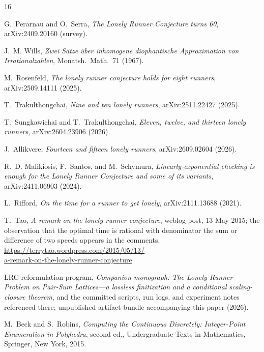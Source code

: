 
\begingroup\sloppy\raggedright
\begin{thebibliography}{16}

G.~Perarnau and O.~Serra,
\emph{The Lonely Runner Conjecture turns 60},
arXiv:2409.20160 (survey).

J.~M. Wills,
\emph{Zwei S\"atze \"uber inhomogene diophantische Approximation von
Irrationalzahlen},
Monatsh.\ Math.\ 71 (1967).

M.~Rosenfeld,
\emph{The lonely runner conjecture holds for eight runners},
arXiv:2509.14111 (2025).

T.~Trakulthongchai,
\emph{Nine and ten lonely runners},
arXiv:2511.22427 (2025).

T.~Sungkawichai and T.~Trakulthongchai,
\emph{Eleven, twelve, and thirteen lonely runners},
arXiv:2604.23906 (2026).

J.~Allikvere,
\emph{Fourteen and fifteen lonely runners},
arXiv:2609.02604 (2026).

R.~D. Malikiosis, F.~Santos, and M.~Schymura,
\emph{Linearly-exponential checking is enough for the Lonely Runner
Conjecture and some of its variants},
arXiv:2411.06903 (2024).

L.~Rifford,
\emph{On the time for a runner to get lonely},
arXiv:2111.13688 (2021).

T.~Tao,
\emph{A remark on the lonely runner conjecture},
weblog post, 13 May 2015; the observation that the optimal time is
rational with denominator the sum or difference of two speeds appears
in the comments.
\\[2pt]
\url{https://terrytao.wordpress.com/2015/05/13/}\\
\url{a-remark-on-the-lonely-runner-conjecture}

LRC reformulation program,
\emph{Companion monograph: The Lonely Runner Problem on Pair-Sum
Lattices---a lossless finitization and a conditional scaling-closure
theorem}, and the committed scripts, run logs, and experiment notes
referenced there; unpublished artifact bundle accompanying this paper
(2026).

M.~Beck and S.~Robins,
\emph{Computing the Continuous Discretely: Integer-Point Enumeration
in Polyhedra}, second ed.,
Undergraduate Texts in Mathematics, Springer, New York, 2015.


\end{thebibliography}
